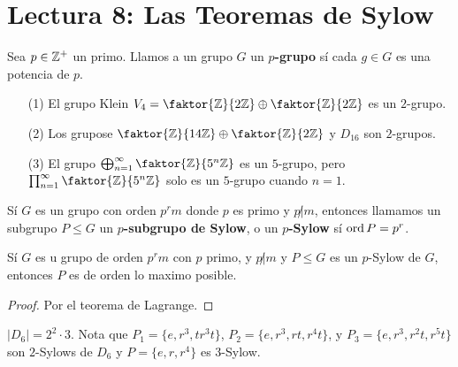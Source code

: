 \section*{Lectura 8: Las Teoremas de Sylow}

\begin{definition}
    Sea $p \in \mathbb{Z}^+$ un primo. Llamos a un grupo $G$ un \textbf{$p$-grupo} s\'i
    cada $g \in G$ es una potencia de  $p$.
\end{definition}

\begin{example}\label{}
    \begin{enumerate}
        \item[(1)] El grupo Klein $V_4=\faktor{\Z}{2\Z} \oplus \faktor{\Z}{2\Z}$
            es un $2$-grupo.

        \item[(2)] Los grupose $\faktor{\Z}{14\Z} \oplus \faktor{\Z}{2\Z}$ y
            $D_{16}$ son $2$-grupos.

        \item[(3)] El grupo $\bigoplus_{n=1}^{\infty}{\faktor{\Z}{5^n\Z}}$ es un
            $5$-grupo, pero  $\prod_{n=1}^{\infty}{\faktor{\Z}{5^n\Z}}$ solo es
            un $5$-grupo cuando $n=1$.
    \end{enumerate}
\end{example}

\begin{definition}
    S\'i $G$ es un grupo con orden  $p^rm$ donde  $p$ es primo y  $p \not| m$,
    entonces llamamos un subgrupo  $P \leq G$ un \textbf{$p$-subgrupo de Sylow},
    o un \textbf{$p$-Sylow} s\'i $\operatorname{ord}{P}=p^r$.
\end{definition}

\begin{lemma}\label{8.31}
    S\'i $G$ es u grupo de orden  $p^rm$ con  $p$ primo, y $p \not|m$ y $P \leq
    G$ es un  $p$-Sylow de  $G$, entonces  $P$ es de orden lo maximo posible.
\end{lemma}
\begin{proof}
    Por el teorema de Lagrange.
\end{proof}

\begin{example}\label{}
    $|D_6|=2^2 \cdot 3$. Nota que $P_1=\{e,r^3,tr^3t\}$,
    $P_2=\{e,r^3,rt,r^4t\}$, y $P_3=\{e,r^3,r^2t,r^5t\}$ son $2$-Sylows de
    $D_6$ y $P=\{e,r,r^4\}$ es $3$-Sylow.
\end{example}

